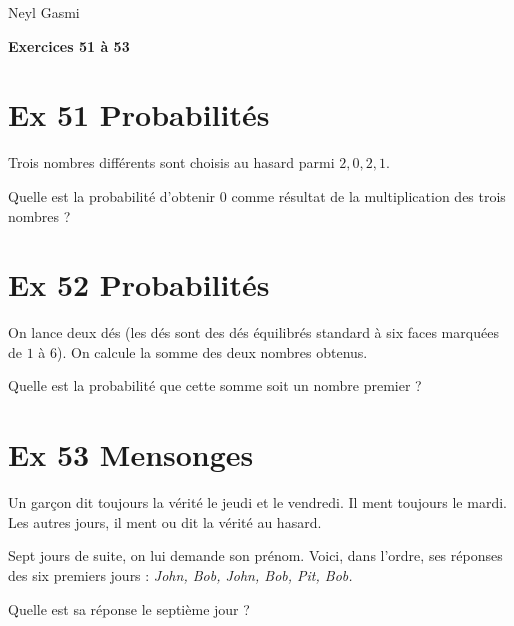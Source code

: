 \documentclass[a4paper,11pt]{article}
\begin{document}
Neyl Gasmi
\begin{center}
{\Large \textbf{Exercices 51 à 53}}
\end{center}
\bigskip

\section*{Ex 51 \quad Probabilités}
Trois nombres différents sont choisis au hasard parmi \(2, 0, 2, 1\).  

Quelle est la probabilité d’obtenir \(0\) comme résultat de la multiplication des trois nombres ?


\section*{Ex 52 \quad Probabilités}
On lance deux dés (les dés sont des dés équilibrés standard à six faces marquées de \(1\) à \(6\)).  
On calcule la somme des deux nombres obtenus.  

Quelle est la probabilité que cette somme soit un nombre premier ?

\section*{Ex 53 \quad Mensonges}
Un garçon dit toujours la vérité le jeudi et le vendredi.  
Il ment toujours le mardi.  
Les autres jours, il ment ou dit la vérité au hasard.  

Sept jours de suite, on lui demande son prénom. Voici, dans l’ordre, ses réponses des six premiers jours :  
\emph{John, Bob, John, Bob, Pit, Bob.}  

Quelle est sa réponse le septième jour ?
\end{document}
